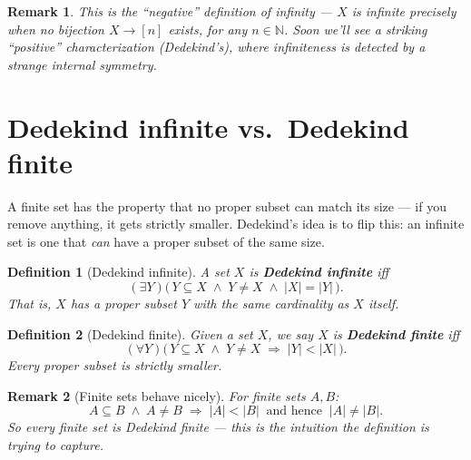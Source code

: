 \documentclass[11pt]{article}
\theoremstyle{defstyle}
\newtheorem{definition}{Definition}[section]
\theoremstyle{thmstyle}
\theoremstyle{notstyle}
\newtheorem*{remark}{Remark}
\theoremstyle{cautionstyle}
\newcommand{\N}{\mathbb{N}}
\begin{document}
\begin{notebox}
\begin{remark}
This is the ``negative'' definition of infinity --- $X$ is infinite precisely when no bijection $X \to [n]$ exists, for any $n \in \N$. Soon we'll see a striking ``positive'' characterization (Dedekind's), where infiniteness is detected by a strange internal symmetry.
\end{remark}
\end{notebox}

\section{Dedekind infinite vs.\ Dedekind finite}

A finite set has the property that no proper subset can match its size --- if you remove anything, it gets strictly smaller. Dedekind's idea is to flip this: an infinite set is one that \emph{can} have a proper subset of the same size.

\begin{defbox}
\begin{definition}[Dedekind infinite]
A set $X$ is \textbf{Dedekind infinite} iff
\[
  (\exists Y)\bigl(\, Y \subseteq X \;\land\; Y \neq X \;\land\; |X| = |Y| \,\bigr).
\]
That is, $X$ has a proper subset $Y$ with the same cardinality as $X$ itself.
\end{definition}
\end{defbox}

\begin{defbox}
\begin{definition}[Dedekind finite]
Given a set $X$, we say $X$ is \textbf{Dedekind finite} iff
\[
  (\forall Y)\bigl(\, Y \subseteq X \;\land\; Y \neq X \;\Rightarrow\; |Y| < |X| \,\bigr).
\]
Every proper subset is \emph{strictly} smaller.
\end{definition}
\end{defbox}

\begin{notebox}
\begin{remark}[Finite sets behave nicely]
For finite sets $A, B$:
\[
  A \subseteq B \;\land\; A \neq B \;\Longrightarrow\; |A| < |B| \;\;\text{and hence}\;\; |A| \neq |B|.
\]
So every finite set is Dedekind finite --- this is the intuition the definition is trying to capture.
\end{remark}
\end{notebox}
\end{document}
